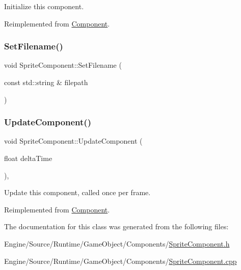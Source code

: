 Initialize this component. 

Reimplemented from \mbox{\hyperlink{class_component_a65053e7e92ff6344e6b028111e43c3c9}{Component}}.

\mbox{\label{class_sprite_component_a429074e2f4eb31f92dff67fe1b89da55}} 
\subsubsection{\texorpdfstring{Set\+Filename()}{SetFilename()}}
{\footnotesize\ttfamily void Sprite\+Component\+::\+Set\+Filename (\begin{DoxyParamCaption}\item[{const std\+::string \&}]{filepath }\end{DoxyParamCaption})}

\mbox{\label{class_sprite_component_aba00f9c0ecc0a0de41f271267c5440ff}} 
\subsubsection{\texorpdfstring{Update\+Component()}{UpdateComponent()}}
{\footnotesize\ttfamily void Sprite\+Component\+::\+Update\+Component (\begin{DoxyParamCaption}\item[{float}]{delta\+Time }\end{DoxyParamCaption})\hspace{0.3cm}{\ttfamily [override]}, {\ttfamily [virtual]}}

Update this component, called once per frame. 

Reimplemented from \mbox{\hyperlink{class_component_a8afb7c9504f763728bfedf642cfc5f43}{Component}}.



The documentation for this class was generated from the following files\+:\begin{DoxyCompactItemize}
\item 
Engine/\+Source/\+Runtime/\+Game\+Object/\+Components/\mbox{\hyperlink{_sprite_component_8h}{Sprite\+Component.\+h}}\item 
Engine/\+Source/\+Runtime/\+Game\+Object/\+Components/\mbox{\hyperlink{_sprite_component_8cpp}{Sprite\+Component.\+cpp}}\end{DoxyCompactItemize}
